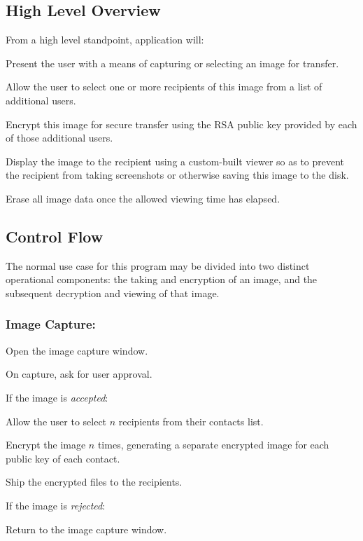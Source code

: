 \documentclass[11pt, a4paper,titlepage]{report}
\begin{document}
\subsection*{High Level Overview}
From a high level standpoint, application will:
\begin{itemize*}
	\item {Present the user with a means of capturing or selecting an image for transfer.}
	\item {Allow the user to select one or more recipients of this image from a list of additional users.}
	\item {Encrypt this image for secure transfer using the RSA public key provided by each of those additional users.}
	\item {Display the image to the recipient using a custom-built viewer so as to prevent the recipient from taking screenshots or otherwise saving this image to the disk.}
	\item {Erase all image data once the allowed viewing time has elapsed.}
\end{itemize*} 

\subsection*{Control Flow}
The normal use case for this program may be divided into two distinct operational components: the taking and encryption of an image, and the subsequent decryption and viewing of that image.

\subsubsection{Image Capture:}
\begin{itemize*}
	\item Open the image capture window.
	\item On capture, ask for user approval.
	\begin{itemize*}
		\item[] If the image is \emph{accepted}:
		\begin{itemize*}
			\item Allow the user to select $n$ recipients from their contacts list.
			\item Encrypt the image $n$ times, generating a separate encrypted image for each public key of each contact.
			\item Ship the encrypted files to the recipients.
		\end{itemize*}
		\item[] If the image is \emph{rejected}:
		\begin{itemize*}
			\item Return to the image capture window.
		\end{itemize*}
	\end{itemize*}
\end{itemize*}
\end{document}
